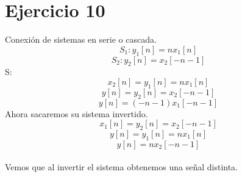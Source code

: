 \documentclass[10pt,a4paper]{report}
\begin{document}
\section{Ejercicio 10}

Conexión de sistemas en serie o cascada.\\
\[ S_{1}: y_{1}\left[n\right] = nx_{1}\left[n\right] \]
\[ S_{2}: y_{2}\left[n\right] = x_{2}\left[-n-1\right] \]
S:
\[ x_{2}\left[n \right] = y_{1}\left[n\right] = nx_{1}\left[n\right] \]
\[ y\left[n\right] = y_{2}\left[n\right] = x_{2}\left[-n-1\right] \]
\[ y\left[n\right] = \left(-n-1\right)x_{1}\left[-n-1\right] \]
Ahora sacaremos su sistema invertido.\\
\[ x_{1}\left[n\right] = y_{2}\left[n\right]=x_{2}\left[-n-1\right] \]
\[ y\left[n\right] = y_{1}\left[n\right] = nx_{1}\left[n\right] \]
\[ y\left[n\right] = nx_{2}\left[-n-1\right] \]\\
Vemos que al invertir el sistema obtenemos una señal distinta.
\end{document}
